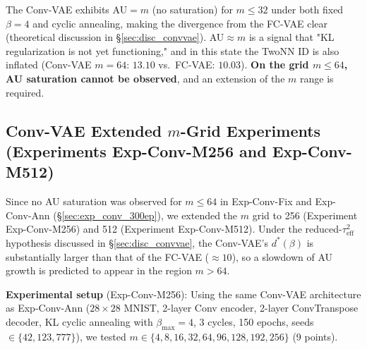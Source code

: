\documentclass[make,article,submit,pdftex,moreauthors]{Definitions/mdpi}
\begin{document}
The Conv-VAE exhibits AU$=m$ (no saturation) for $m \leq 32$ under both fixed $\beta=4$ and cyclic annealing,
making the divergence from the FC-VAE clear (theoretical discussion in \S\ref{sec:disc_convvae}).
AU$\approx m$ is a signal that "KL regularization is not yet functioning," and in this state the TwoNN ID
is also inflated (Conv-VAE $m=64$: $13.10$ vs.\ FC-VAE: $10.03$).
\textbf{On the grid $m \leq 64$, AU saturation cannot be observed}, and an extension of the $m$ range is required.

\subsection{Conv-VAE Extended $m$-Grid Experiments (Experiments Exp-Conv-M256 and Exp-Conv-M512)}\label{sec:exp_en}

Since no AU saturation was observed for $m \leq 64$ in Exp-Conv-Fix and Exp-Conv-Ann (\S\ref{sec:exp_conv_300ep}),
we extended the $m$ grid to 256 (Experiment Exp-Conv-M256) and 512 (Experiment Exp-Conv-M512).
Under the reduced-$\tau^2_\mathrm{eff}$ hypothesis discussed in \S\ref{sec:disc_convvae},
the Conv-VAE's $d^*(\beta)$ is substantially larger than that of the FC-VAE ($\approx 10$),
so a slowdown of AU growth is predicted to appear in the region $m>64$.

\textbf{Experimental setup} (Exp-Conv-M256):
Using the same Conv-VAE architecture as Exp-Conv-Ann ($28\times28$ MNIST, 2-layer Conv encoder,
2-layer ConvTranspose decoder, KL cyclic annealing with $\beta_\mathrm{max}=4$, 3 cycles,
150 epochs, seeds$\in\{42,123,777\}$),
we tested $m \in \{4, 8, 16, 32, 64, 96, 128, 192, 256\}$ (9 points).
\end{document}
